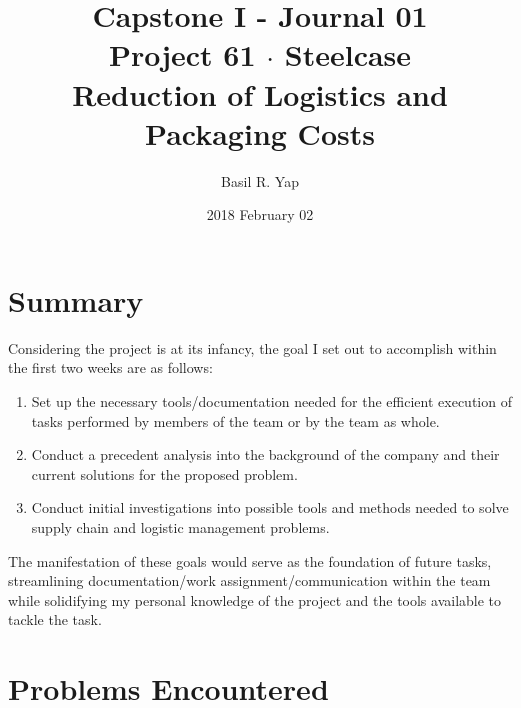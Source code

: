 \documentclass[a4paper, fleqn]{article}
\begin{document}
\title{Capstone I - Journal 01 \\ Project 61 $\cdot$  Steelcase \\ Reduction of Logistics and Packaging Costs}
\author{Basil R. Yap}
\date{2018 February 02}
\maketitle

\section{Summary}

Considering the project is at its infancy, the goal I set out to accomplish within the first two weeks are as follows:
\begin{enumerate}[label=(\alph{*})]
\item Set up the necessary tools/documentation needed for the efficient execution of tasks performed by members of the team or by the team as whole.
\item Conduct a precedent analysis into the background of the company and their current solutions for the proposed problem.
\item Conduct initial investigations into possible tools and methods needed to solve supply chain and logistic management problems. 
\end{enumerate} 
The manifestation of these goals would serve as the foundation of future tasks, streamlining documentation/work assignment/communication within the team while solidifying my personal knowledge of the project and the tools available to tackle the task.


\section{Problems Encountered}
\end{document}

